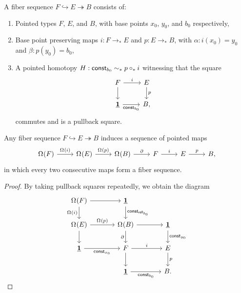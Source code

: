 \begin{defn}
A fiber sequence $F\hookrightarrow E \twoheadrightarrow B$ consists of:
\begin{enumerate}
\item Pointed types $F$, $E$, and $B$, with base points $x_0$, $y_0$, and $b_0$ respectively, 
\item Base point preserving maps $i:F\to_\ast E$ and $p:E\to_\ast B$, with $\alpha:i(x_0)=y_0$ and $\beta:p(y_0)=b_0$,
\item A pointed homotopy $H:\mathsf{const}_{b_0}\sim_\ast p\circ_\ast i$ witnessing that the square
\begin{equation*}
\begin{tikzcd}
F \arrow[r,"i"] \arrow[d] & E \arrow[d,"p"] \\
\unit \arrow[r,swap,"\mathsf{const}_{b_0}"] & B,
\end{tikzcd}
\end{equation*}
commutes and is a pullback square.
\end{enumerate}
\end{defn}

\begin{lem}
Any fiber sequence $F\hookrightarrow E\twoheadrightarrow B$ induces a sequence of pointed maps
\begin{equation*}
\begin{tikzcd}
\loopspace{F} \arrow[r,"\loopspace{i}"] & \loopspace{E} \arrow[r,"\loopspace{p}"] & \loopspace{B} \arrow[r,"\partial"] & F \arrow[r,"i"] & E \arrow[r,"p"] & B,
\end{tikzcd}
\end{equation*}
in which every two consecutive maps form a fiber sequence.
\end{lem}

\begin{proof}
By taking pullback squares repeatedly, we obtain the diagram
\begin{equation*}
\begin{gathered}[b]
\begin{tikzcd}[column sep=large]
\loopspace{F} \arrow[d,swap,"\loopspace{i}"] \arrow[r] & \unit \arrow[d,"\mathsf{const}_{\refl{b_0}}"] \\
\loopspace{E} \arrow[r,"\loopspace{p}"] \arrow[d] & \loopspace{B} \arrow[r] \arrow[d,swap,"\partial"] & \unit \arrow[d,"\mathsf{const}_{y_0}"] \\
\unit \arrow[r,swap,"\mathsf{const}_{x_0}"] & F \arrow[r,"i"] \arrow[d] & E \arrow[d,"p"] \\
& \unit \arrow[r,swap,"\mathsf{const}_{b_0}"] & B.
\end{tikzcd}\\[-\dp\strutbox]
\end{gathered}\qedhere
\end{equation*}
\end{proof}

